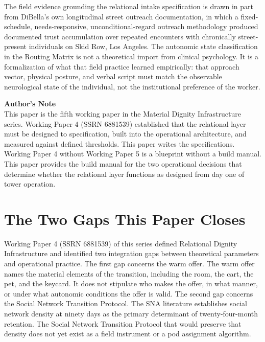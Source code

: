 \documentclass[12pt, letterpaper]{article}
\begin{document}
The field evidence grounding the relational intake specification is drawn in part from DiBella's own longitudinal street outreach documentation, in which a fixed-schedule, needs-responsive, unconditional-regard outreach methodology produced documented trust accumulation over repeated encounters with chronically street-present individuals on Skid Row, Los Angeles. The autonomic state classification in the Routing Matrix is not a theoretical import from clinical psychology. It is a formalization of what that field practice learned empirically: that approach vector, physical posture, and verbal script must match the observable neurological state of the individual, not the institutional preference of the worker.

\vspace{8pt}
\noindent\textbf{Author's Note}\\[1pt]
This paper is the fifth working paper in the Material Dignity Infrastructure series. Working Paper 4 (SSRN 6881539) established that the relational layer must be designed to specification, built into the operational architecture, and measured against defined thresholds. This paper writes the specifications. Working Paper 4 without Working Paper 5 is a blueprint without a build manual. This paper provides the build manual for the two operational decisions that determine whether the relational layer functions as designed from day one of tower operation.

\newpage
\begingroup
{}
\setlength{\cftbeforesecskip}{2pt}
\setlength{\cftbeforesubsecskip}{-2pt}
\tableofcontents
\endgroup
\clearpage
{}

\clearpage
\section{The Two Gaps This Paper Closes}

Working Paper 4 (SSRN 6881539) of this series defined Relational Dignity Infrastructure and identified two integration gaps between theoretical parameters and operational practice. The first gap concerns the warm offer. The warm offer names the material elements of the transition, including the room, the cart, the pet, and the keycard. It does not stipulate who makes the offer, in what manner, or under what autonomic conditions the offer is valid. The second gap concerns the Social Network Transition Protocol. The SNA literature establishes social network density at ninety days as the primary determinant of twenty-four-month retention. The Social Network Transition Protocol that would preserve that density does not yet exist as a field instrument or a pod assignment algorithm.
\end{document}
